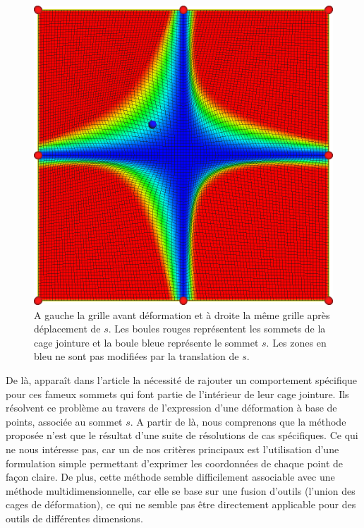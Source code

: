 \begin{figure}[ht]
\begin{center}
    \includegraphics[scale=0.35]{starCage-jointure-deformation}
    \caption{A gauche la grille avant déformation et à droite la même
      grille après déplacement de $s$. Les boules rouges représentent
      les sommets de la cage jointure et la boule bleue représente le
      sommet $s$. Les zones en bleu ne sont pas modifiées par la
      translation de $s$.}
    \label{MELjoi}
  \end{center}
\end{figure}

De là, apparaît dans l'article la nécessité de rajouter un
comportement spécifique pour ces fameux sommets qui font partie de
l'intérieur de leur cage jointure. Ils résolvent ce problème au
travers de l'expression d'une déformation à base de points, associée
au sommet $s$. A partir de là, nous comprenons que la méthode proposée
\cite{GPCP13} n'est que le résultat d'une suite de résolutions de cas
spécifiques. Ce qui ne nous intéresse pas, car un de nos critères
principaux est l'utilisation d'une formulation simple permettant
d'exprimer les coordonnées de chaque point de façon claire. De plus,
cette méthode semble difficilement associable avec une méthode
multidimensionnelle, car elle se base sur une fusion d'outils (l'union
des cages de déformation), ce qui ne semble pas être directement
applicable pour des outils de différentes dimensions.

